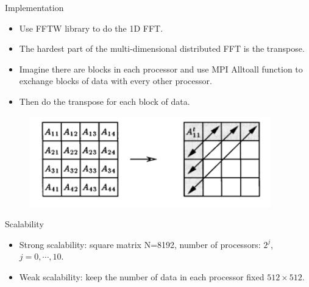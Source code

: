 \documentclass{beamer}
\begin{document}
\begin{frame}{Implementation}
\begin{itemize}
\item Use FFTW library to do the 1D FFT.
\item The hardest part of the multi-dimensional distributed FFT is the transpose.
\item  Imagine there are blocks in each processor and use MPI Alltoall function to exchange blocks of data with every other processor.
\item  Then do the transpose for each block of data.
\end{itemize}

\begin{figure}
\includegraphics[width=0.8\linewidth]{transpose.png}
\end{figure}
\end{frame}

\begin{frame}{Scalability}
\begin{itemize}
\item Strong scalability: square matrix N=8192, number of processors: $2^{j}$, $j=0,\cdots,10$. 
\item Weak scalability: keep the number of data in each processor fixed $512\times512$.
\end{itemize}
\begin{figure}
\end{figure}
\end{frame}
\end{document}
